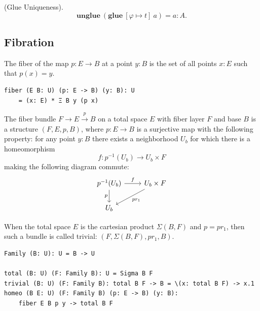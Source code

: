 \documentclass{article}
\begin{document}
\begin{theorem} (Glue Uniqueness).
$$
  \mathbf{unglue}\ (\mathbf{glue}\ [\varphi \mapsto t]\ a) = a : A.
$$
\end{theorem}

\newpage
\subsection{Fibration}

\begin{definition}[Fiber]
The fiber of the map \( p: E \rightarrow B \) at a point \( y: B \)
is the set of all points \( x: E \) such that \( p(x) = y \).

\begin{lstlisting}[mathescape=true]
fiber (E B: U) (p: E -> B) (y: B): U
    = (x: E) * Ξ B y (p x)
\end{lstlisting}
\end{definition}

\begin{definition}
The fiber bundle \( F \rightarrow E \xrightarrow{p} B \) on a
total space \( E \) with fiber layer \( F \) and base \( B \) is a structure \( (F,E,p,B) \),
where \( p: E \rightarrow B \) is a surjective map with the following property:
for any point \( y: B \) there exists a neighborhood \( U_b \)
for which there is a homeomorphism
\[
f: p^{-1}(U_b) \rightarrow U_b \times F
\]
making the following diagram commute:
\[
\begin{tikzcd}
p^{-1}(U_b) \arrow[r, "f"] \arrow[d, "p"'] & U_b \times F \arrow[dl, "pr_1"] \\
U_b &
\end{tikzcd}
\]
\end{definition}

\begin{definition}
When the total space \( E \) is the cartesian product \( \Sigma(B,F) \)
and \( p = pr_1 \), then such a bundle is called trivial: \( (F,\Sigma(B,F),pr_1,B) \).

\begin{lstlisting}[mathescape=true]
Family (B: U): U = B -> U

total (B: U) (F: Family B): U = Sigma B F
trivial (B: U) (F: Family B): total B F -> B = \(x: total B F) -> x.1
homeo (B E: U) (F: Family B) (p: E -> B) (y: B):
    fiber E B p y -> total B F
\end{lstlisting}
\end{definition}
\end{document}

